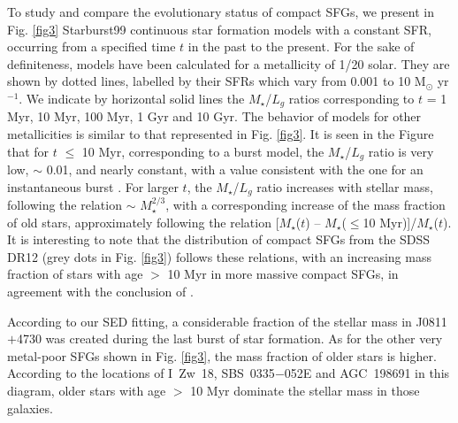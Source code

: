 \documentclass[useAMS,usenatbib]{mn2e}
\begin{document}
To study and compare the evolutionary status of compact SFGs, we
present in Fig. \ref{fig3} {\sc Starburst99} continuous star
formation models with a constant SFR, occurring from a specified time $t$ 
in the past to the present. For the sake of definiteness, models have been 
calculated for a metallicity of 1/20 solar. They are shown by dotted lines, 
labelled by their SFRs which vary from 0.001 to 10 M$_\odot$ yr$^{-1}$. 
We indicate by horizontal
solid lines the $M_\star$/$L_g$ ratios corresponding to $t$ = 1 Myr, 10 Myr, 
100 Myr, 1 Gyr and 10 Gyr. The behavior of models for other metallicities is 
similar to that represented in Fig. \ref{fig3}.
It is seen in the Figure that for $t$ $\leq$ 10 Myr,
corresponding to a burst model, the $M_\star$/$L_g$ ratio is 
very low, $\sim$ 0.01, and nearly constant, with a value 
consistent with the one for an instantaneous burst \citep{L99}. For larger
$t$, the $M_\star$/$L_g$ ratio increases with stellar mass, 
following the relation $\sim$ $M_\star^{2/3}$, with a corresponding increase 
of the mass fraction of old stars, approximately following the relation
[$M_\star$($t$) -- $M_\star$($\leq$10 Myr)]/$M_\star$($t$). It is interesting to
note that the distribution of compact SFGs from the SDSS DR12 (grey dots in 
Fig. \ref{fig3}) follows these relations, with an increasing mass fraction of 
stars with age $>$ 10 Myr in more massive compact SFGs, in agreement with the
conclusion of \citet{I11}.

According to our SED fitting, a considerable fraction of the stellar mass 
in J0811$+$4730 was created during the last burst of star formation.
As for the other very metal-poor SFGs shown in Fig. \ref{fig3},
the mass fraction of older stars is higher. According to the locations
of I~Zw~18, SBS~0335$-$052E and AGC~198691 in this diagram, older stars with 
age $>$ 10 Myr dominate the stellar mass in those galaxies. 
\end{document}
